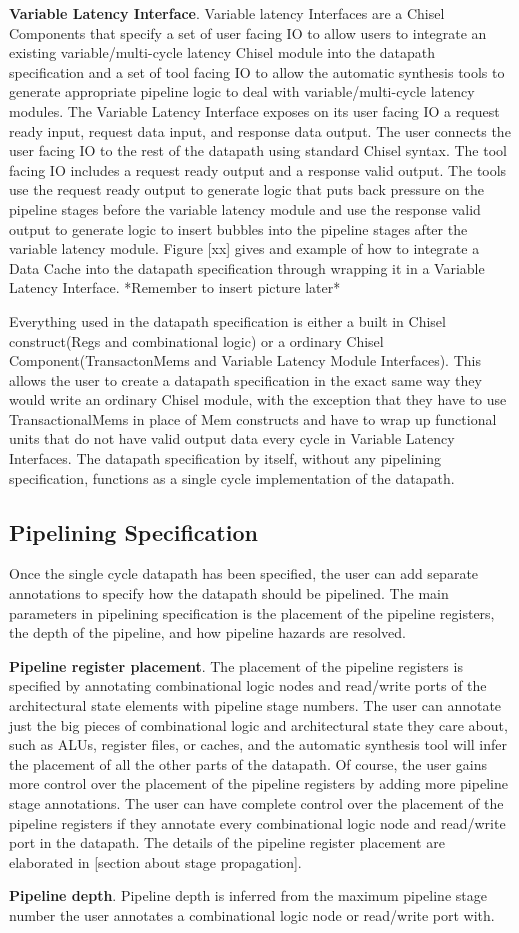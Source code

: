 {\bf Variable Latency Interface}. Variable latency Interfaces are a
Chisel Components that specify a set of user facing IO to allow users
to integrate an existing variable/multi-cycle latency Chisel module
into the datapath specification and a set of tool facing IO to allow
the automatic synthesis tools to generate appropriate pipeline logic
to deal with variable/multi-cycle latency modules. The Variable
Latency Interface exposes on its user facing IO a request ready input,
request data input, and response data output. The user connects the
user facing IO to the rest of the datapath using standard Chisel
syntax. The tool facing IO includes a request ready output and a
response valid output. The tools use the request ready output to
generate logic that puts back pressure on the pipeline stages before
the variable latency module and use the response valid output to
generate logic to insert bubbles into the pipeline stages after the
variable latency module. Figure [xx] gives and example of how to
integrate a Data Cache into the datapath specification through
wrapping it in a Variable Latency Interface. *Remember to insert
picture later*

Everything used in the datapath specification is either a built in
Chisel construct(Regs and combinational logic) or a ordinary Chisel
Component(TransactonMems and Variable Latency Module Interfaces). This
allows the user to create a datapath specification in the exact same
way they would write an ordinary Chisel module, with the exception
that they have to use TransactionalMems in place of Mem constructs and
have to wrap up functional units that do not have valid output data
every cycle in Variable Latency Interfaces. The datapath specification
by itself, without any pipelining specification, functions as a single
cycle implementation of the datapath.

\subsection {Pipelining Specification}
Once the single cycle datapath has been specified, the user can add
separate annotations to specify how the datapath should be
pipelined. The main parameters in pipelining specification is the
placement of the pipeline registers, the depth of the pipeline, and
how pipeline hazards are resolved.

{\bf Pipeline register placement}. The placement of the pipeline
registers is specified by annotating combinational logic nodes and
read/write ports of the architectural state elements with pipeline
stage numbers. The user can annotate just the big pieces of combinational
logic and architectural state they care about, such as ALUs, register
files, or caches, and the automatic synthesis tool will infer the
placement of all the other parts of the datapath. Of course, the user
gains more control over the placement of the pipeline registers by
adding more pipeline stage annotations. The user can have complete
control over the placement of the pipeline registers if they annotate
every combinational logic node and read/write port in the datapath. The details of the pipeline
register placement are elaborated in [section about stage
  propagation].

{\bf Pipeline depth}. Pipeline depth is inferred from the maximum
pipeline stage number the user annotates a combinational logic node or
read/write port with.


